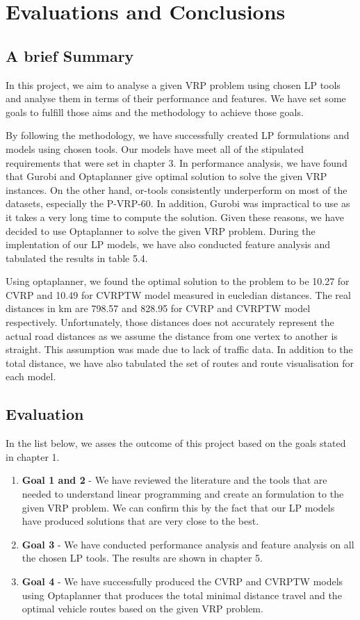 \chapter{Evaluations and Conclusions}
\section{A brief Summary}
In this project, we aim to analyse a given VRP problem using chosen LP tools and analyse them in terms of their performance
and features. We have set some goals to fulfill those aims and the methodology to achieve those goals.

By following the methodology, we have successfully created LP formulations and models using
chosen tools. Our models have meet all of the stipulated requirements that were set in chapter 3.
In performance analysis, we have found that Gurobi and Optaplanner give optimal solution to solve the given VRP instances. On the other hand,
or-tools consistently underperform on most of the datasets, especially the P-VRP-60. In addition, Gurobi was impractical to use
as it takes a very long time to compute the solution. Given these reasons, we have decided to use Optaplanner to solve the given
VRP problem. During the implentation of our LP models, we have also conducted feature analysis and tabulated the results in table
5.4.

Using optaplanner, we found the optimal solution to the problem to be 10.27 for CVRP and 10.49 for CVRPTW model measured in eucledian distances.
The real distances in km are 798.57 and 828.95 for CVRP and CVRPTW model respectively. Unfortunately, those distances does not
accurately represent the actual road distances as we assume the distance from one vertex to another is straight. This assumption
was made due to lack of traffic data. In addition to the total distance, we have also
tabulated the set of routes and route visualisation for each model.

\section{Evaluation}
In the list below, we asses the outcome of this project based on the goals stated in chapter 1.
\begin{enumerate}
    \item \textbf{Goal 1 and 2} - We have reviewed the literature and the tools that are needed to understand linear programming and create an
     formulation to the given VRP problem. We can confirm this by the fact that our LP models have produced solutions that
     are very close to the best.
    \item \textbf{Goal 3} - We have conducted performance analysis and feature analysis on all the chosen LP tools. The results
    are shown in chapter 5.
    \item \textbf{Goal 4} - We have successfully produced the CVRP and CVRPTW models using Optaplanner that produces the
     total minimal distance travel and the optimal vehicle routes based on the given VRP problem.
\end{enumerate}

